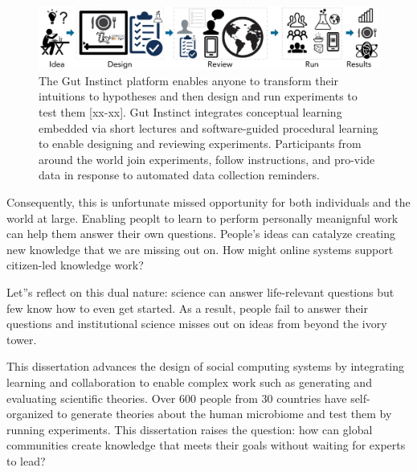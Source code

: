 \begin{figure}[b] 
  \centering
  \includegraphics[width=1.0\textwidth]{figures/intro/intro-1}
  \caption[]
{The Gut Instinct platform enables anyone to transform their intuitions to hypotheses 
and then design and run experiments to test them [xx-xx]. Gut Instinct integrates 
conceptual learning embedded via short lectures and software-guided procedural 
learning to enable designing and reviewing experiments. Participants from around
 the world join experiments, follow instructions, and pro-vide data in response to 
automated data collection reminders. }
  \label{fig:intro-1}
\end{figure}

Consequently, this is unfortunate missed opportunity for both individuals and the world at large. Enabling peoplt to learn to perform personally meanignful work can help them answer their own questions. People's ideas can catalyze creating new knowledge that we are missing out on.  How might online systems support citizen-led knowledge work? 

Let''s reflect on this dual nature:  science can answer life-relevant questions but few know how to even get started. As a result, people fail to answer their questions and institutional science misses out on ideas from beyond the ivory tower. 





This dissertation advances the design of social computing systems by integrating learning and collaboration to enable complex work such as generating and evaluating scientific theories. Over 600 people from 30 countries have self-organized to generate theories about the human microbiome and test them by running experiments. This dissertation raises the question: how can global communities create knowledge that meets their goals without waiting for experts to lead? 

